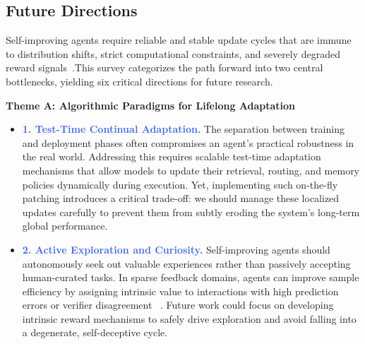 \subsection{Future Directions}
Self-improving agents require reliable and stable update cycles that are immune to distribution shifts, strict computational constraints, and severely degraded reward signals~\citep{zhuge2026ai}.This survey categorizes the path forward into two central bottlenecks, yielding six critical directions for future research.



\vspace{0.35em}
\noindent\textbf{Theme A: Algorithmic Paradigms for Lifelong Adaptation}
\vspace{0.2em}

\begin{itemize}[leftmargin=*, label={}, itemsep=0.9em, topsep=0.2em]
\item \textbf{\textcolor{RoyalBlue}{1. Test-Time Continual Adaptation.}} 
The separation between training and deployment phases often compromises an agent's practical robustness in the real world. Addressing this requires scalable test-time adaptation mechanisms \citep{xia2025livesweagentsoftwareengineeringagents, yang2026ttcstesttimecurriculumsynthesis} that allow models to update their retrieval, routing, and memory policies dynamically during execution. Yet, implementing such on-the-fly patching introduces a critical trade-off: we should manage these localized updates carefully to prevent them from subtly eroding the system's long-term global performance.



\item \textbf{\textcolor{RoyalBlue}{2. Active Exploration and Curiosity.}}  
Self-improving agents should autonomously seek out valuable experiences rather than passively accepting human-curated tasks. In sparse feedback domains, agents can improve sample efficiency by assigning intrinsic value to interactions with high prediction errors or verifier disagreement ~\citep{schmidhuber1991possibility, zhao2026curious}. Future work could focus on developing intrinsic reward mechanisms to safely drive exploration and avoid falling into a degenerate, self-deceptive cycle.



\end{itemize}
